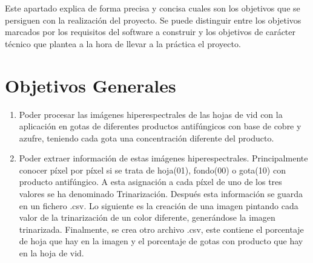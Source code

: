
Este apartado explica de forma precisa y concisa cuales son los objetivos que se persiguen con la realización del proyecto. Se puede distinguir entre los objetivos marcados por los requisitos del software a construir y los objetivos de carácter técnico que plantea a la hora de llevar a la práctica el proyecto.

\section {Objetivos Generales}
\begin{enumerate}
    \item Poder procesar las imágenes hiperespectrales de las hojas de vid con la aplicación en gotas de diferentes productos antifúngicos con base de cobre y azufre, teniendo cada gota una concentración diferente del producto.
    \item Poder extraer información de estas imágenes hiperespectrales. Principalmente conocer píxel por píxel si se trata de hoja(01), fondo(00) o gota(10) con producto antifúngico. A esta asignación a cada píxel de uno de los tres valores se ha denominado Trinarización. Después esta información se guarda en un fichero .csv. Lo siguiente es la creación de  una imagen pintando cada valor de la trinarización de un color diferente, generándose la imagen trinarizada. Finalmente, se crea otro archivo .csv, este contiene el porcentaje de hoja que hay en la imagen y el porcentaje de gotas con producto que hay en la hoja de vid.
\end{enumerate}

